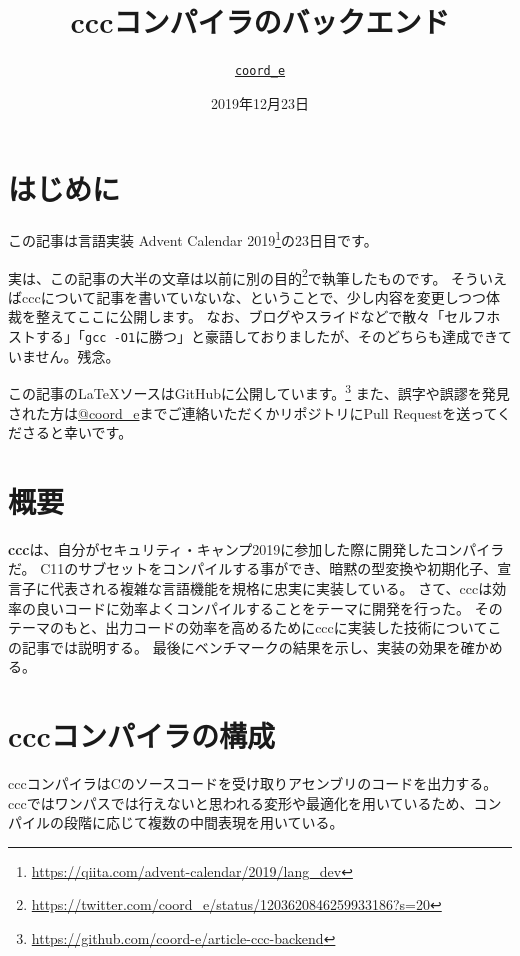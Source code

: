 \documentclass[uplatex,a4paper]{jsarticle}
\title{cccコンパイラのバックエンド}
\author{\href{https://keybase.io/coorde}{\texttt{coord\_e}}}
\date{2019年12月23日}
\begin{document}
\maketitle

\setcounter{page}{1}

\section{はじめに}

この記事は言語実装 Advent Calendar 2019\footnote{\url{https://qiita.com/advent-calendar/2019/lang_dev}}の23日目です。

実は、この記事の大半の文章は以前に別の目的\footnote{\url{https://twitter.com/coord_e/status/1203620846259933186?s=20}}で執筆したものです。
そういえばcccについて記事を書いていないな、ということで、少し内容を変更しつつ体裁を整えてここに公開します。
なお、ブログやスライドなどで散々「セルフホストする」「\texttt{gcc -O1}に勝つ」と豪語しておりましたが、そのどちらも達成できていません。残念。

この記事の\LaTeX ソースはGitHubに公開しています。\footnote{\url{https://github.com/coord-e/article-ccc-backend}}
また、誤字や誤謬を発見された方は\href{https://twitter.com/coord_e}{@coord\_e}までご連絡いただくかリポジトリにPull Requestを送ってくださると幸いです。

\section {概要}
\label{ccc_abstract}

\textbf{ccc}は、自分がセキュリティ・キャンプ2019\cite{seccamp19}に参加した際に開発したコンパイラだ。
C11のサブセットをコンパイルする事ができ、暗黙の型変換や初期化子、宣言子に代表される複雑な言語機能を規格に忠実に実装している。
さて、cccは効率の良いコードに効率よくコンパイルすることをテーマに開発を行った。
そのテーマのもと、出力コードの効率を高めるためにcccに実装した技術についてこの記事では説明する。
最後にベンチマークの結果を示し、実装の効果を確かめる。

\section{cccコンパイラの構成}

cccコンパイラはCのソースコードを受け取りアセンブリのコードを出力する。cccではワンパスでは行えないと思われる変形や最適化を用いているため、コンパイルの段階に応じて複数の中間表現を用いている。
\end{document}
